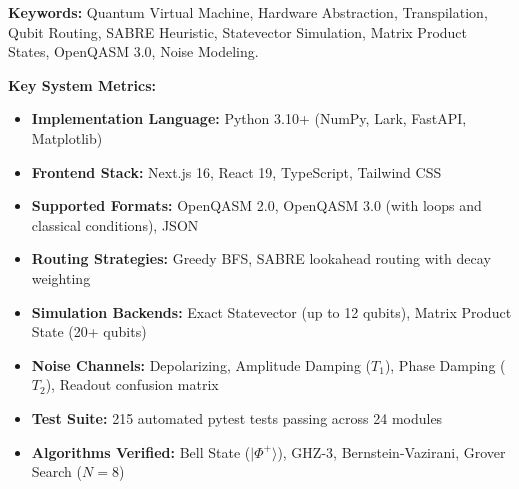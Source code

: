 \noindent\textbf{Keywords:} Quantum Virtual Machine, Hardware Abstraction, Transpilation, Qubit Routing, SABRE Heuristic, Statevector Simulation, Matrix Product States, OpenQASM 3.0, Noise Modeling.

\vspace{0.5cm}

\noindent\textbf{Key System Metrics:}
\begin{itemize}[leftmargin=*, noitemsep]
    \item \textbf{Implementation Language:} Python 3.10+ (NumPy, Lark, FastAPI, Matplotlib)
    \item \textbf{Frontend Stack:} Next.js 16, React 19, TypeScript, Tailwind CSS
    \item \textbf{Supported Formats:} OpenQASM 2.0, OpenQASM 3.0 (with loops and classical conditions), JSON
    \item \textbf{Routing Strategies:} Greedy BFS, SABRE lookahead routing with decay weighting
    \item \textbf{Simulation Backends:} Exact Statevector (up to 12 qubits), Matrix Product State (20+ qubits)
    \item \textbf{Noise Channels:} Depolarizing, Amplitude Damping ($T_1$), Phase Damping ($T_2$), Readout confusion matrix
    \item \textbf{Test Suite:} 215 automated pytest tests passing across 24 modules
    \item \textbf{Algorithms Verified:} Bell State ($|\Phi^+\rangle$), GHZ-3, Bernstein-Vazirani, Grover Search ($N=8$)
\end{itemize}
